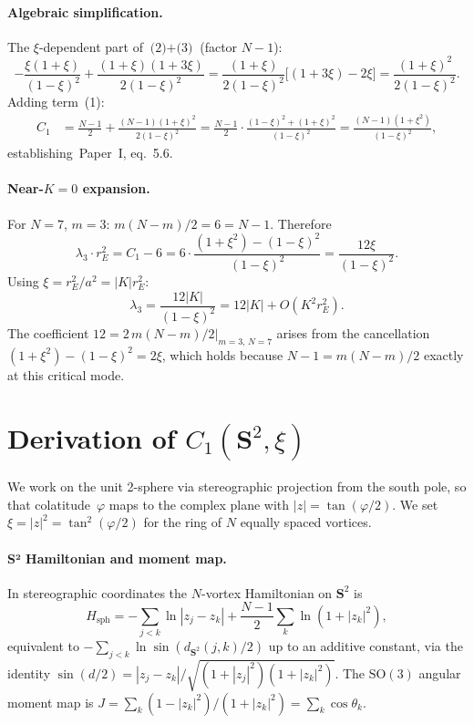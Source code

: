 \paragraph{Algebraic simplification.}
The $\xi$-dependent part of $\text{(2)}+\text{(3)}$ (factor $N-1$):
\[
  -\frac{\xi(1+\xi)}{(1-\xi)^2} + \frac{(1+\xi)(1+3\xi)}{2(1-\xi)^2}
  = \frac{(1+\xi)}{2(1-\xi)^2}\bigl[(1+3\xi) - 2\xi\bigr]
  = \frac{(1+\xi)^2}{2(1-\xi)^2}.
\]
Adding term~(1):
\begin{align*}
  C_1 &= \frac{N-1}{2} + \frac{(N-1)(1+\xi)^2}{2(1-\xi)^2}
       = \frac{N-1}{2}\cdot\frac{(1-\xi)^2+(1+\xi)^2}{(1-\xi)^2}
       = \frac{(N-1)(1+\xi^2)}{(1-\xi)^2},
\end{align*}
establishing~Paper~I, eq.~5.6.

\paragraph{Near-$K=0$ expansion.}
For $N=7$, $m=3$: $m(N-m)/2 = 6 = N-1$.  Therefore
\[
  \lambda_3 \cdot r_E^2 = C_1 - 6
  = 6\cdot\frac{(1+\xi^2) - (1-\xi)^2}{(1-\xi)^2}
  = \frac{12\xi}{(1-\xi)^2}.
\]
Using $\xi = r_E^2/a^2 = |K|r_E^2$:
\[
  \lambda_3 = \frac{12|K|}{(1-\xi)^2} = 12|K| + O(K^2 r_E^2).
\]
The coefficient $12 = 2\,m(N{-}m)/2\big|_{m=3,\,N=7}$ arises from the
cancellation $(1+\xi^2) - (1-\xi)^2 = 2\xi$, which holds because
$N-1 = m(N-m)/2$ exactly at this critical mode.

\section{Derivation of $C_1(\mathbf{S}^2,\xi)$}
\label{app:c1_s2}

We work on the unit 2-sphere via stereographic projection from the
south pole, so that colatitude~$\varphi$ maps to the complex plane
with $|z| = \tan(\varphi/2)$.  We set $\xi = |z|^2 = \tan^2(\varphi/2)$
for the ring of $N$ equally spaced vortices.

\paragraph{S² Hamiltonian and moment map.}
In stereographic coordinates the $N$-vortex Hamiltonian on $\mathbf{S}^2$
is \citep{Kimura1999}
\begin{equation}\label{eq:H_sph}
  H_{\mathrm{sph}} = -\!\sum_{j<k}\ln|z_j - z_k|
    + \frac{N-1}{2}\sum_k \ln(1 + |z_k|^2),
\end{equation}
equivalent to $-\sum_{j<k}\ln\sin(d_{\mathbf{S}^2}(j,k)/2)$ up to
an additive constant, via the identity
$\sin(d/2) = |z_j - z_k|/\sqrt{(1+|z_j|^2)(1+|z_k|^2)}$.
The $\mathrm{SO}(3)$ angular moment map is
$J = \sum_k(1-|z_k|^2)/(1+|z_k|^2) = \sum_k\cos\theta_k$.

